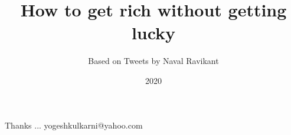 \documentclass[xcolor=dvipsnames,compress,t,pdf]{beamer}
\title[\hspace{4cm} \insertframenumber /\inserttotalframenumber]
{How to get rich without getting lucky}
\subtitle[]{Based on Tweets by Naval Ravikant}
\date{2020}
\begin{document}
\begin{frame}
\titlepage
\end{frame}




\begin{frame}[c]{}
Thanks ...
\vspace{5mm}
yogeshkulkarni@yahoo.com
\end{frame}
\end{document}
